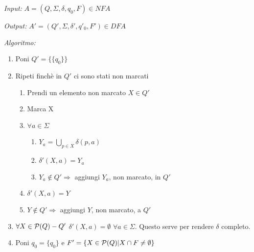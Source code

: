 \begin{description}
	\item \emph{Input:} $A = (Q, \Sigma, \delta, q_0, F) \in NFA$
	\item \emph{Output:} $A' = (Q', \Sigma, \delta', q'_0, F') \in DFA$
	\item \emph{Algoritmo:}
		\begin{enumerate}[label*=\arabic*.]
			\item Poni $Q' = \{\{q_0\}\}$
			\item Ripeti finch\`e in $Q'$ ci sono stati non marcati
				\begin{enumerate}[label*=\arabic*.]
					\item Prendi un elemento non marcato $X \in Q'$
					\item Marca X
					\item $\forall a \in \Sigma$
						\begin{enumerate}[label*=\arabic*.]
							\item $Y_a = \bigcup_{p \in X} \delta(p,a)$
							\item $\delta'(X,a) = Y_a$
							\item $Y_a \notin Q' \Rightarrow$ aggiungi $Y_a$, non marcato, in $Q'$  						
						\end{enumerate}
					\item $\delta'(X,a)=Y$
					\item $Y \notin Q' \Rightarrow$ aggiungi $Y$, non marcato, a $Q'$
		
				\end{enumerate}
			\item $\forall X \in {\cal P}(Q) - Q'$ $\delta'(X, a) = \emptyset$ $ \forall a \in \Sigma$. Questo serve per rendere $\delta$ completo.
			\item Poni $q_0 = \{ q_0\}$ e $F' = \{X \in {\cal P}(Q) | X \cap F \neq \emptyset\}$
		\end{enumerate}
\end{description}

